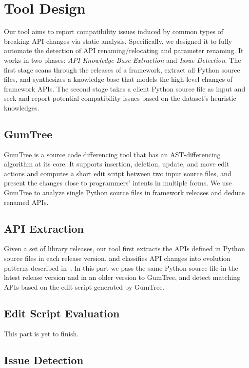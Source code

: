 \chapter{Tool Design}
\label{chp:tool-design}

Our tool aims to report compatibility issues induced by common types of breaking API changes via static analysis. Specifically, we designed it to fully automate the detection of API renaming/relocating and parameter renaming. It works in two phases: \textit{API Knowledge Base Extraction} and \textit{Issue Detection}. The first stage scans through the releases of a framework, extract all Python source files, and synthesizes a knowledge base that models the high-level changes of framework APIs. The second stage takes a client Python source file as input and seek and report potential compatibility issues based on the dataset's heuristic knowledges.

\section{GumTree}

GumTree is a source code differencing tool that has an AST-differencing algorithm at its core. It supports insertion, deletion, update, and move edit actions and computes a short edit script between two input source files, and present the changes close to programmers' intents in multiple forms. We use GumTree to analyze single Python source files in framework releases and deduce renamed APIs.

\section{API Extraction}

Given a set of library releases, our tool first extracts the APIs defined in Python source files in each release version, and classifies API changes into evolution patterns described in~\cite{DBLP:conf/wcre/ZhangZWTLX20}. In this part we pass the same Python source file in the latest release version and in an older version to GumTree, and detect matching APIs based on the edit script generated by GumTree.

\section{Edit Script Evaluation}

This part is yet to finish.

\section{Issue Detection}

